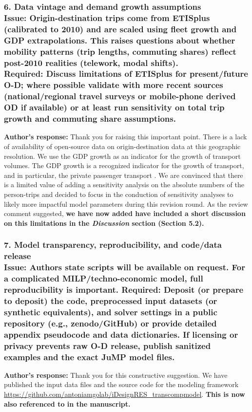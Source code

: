 \documentclass[11pt]{article}
\begin{document}
\color{reviewergrey}

\subsubsection*{6. Data vintage and demand growth assumptions \\ 
\textbf{Issue:} Origin-destination trips come from ETISplus (calibrated to 2010) and are scaled using fleet growth and GDP extrapolations. This raises questions about whether mobility patterns (trip lengths, commuting shares) reflect post-2010 realities (telework, modal shifts). \\
\textbf{Required:} Discuss limitations of ETISplus for present/future O-D; where possible validate with more recent sources (national/regional travel surveys or mobile-phone derived OD if available) or at least run sensitivity on total trip growth and commuting share assumptions.
}
\color{authorblue}
\noindent \textcolor{authorblue}{\textbf{Author's response:}} Thank you for raising this important point. There is a lack of availability of open-source data on origin-destination data at this geographic resolution. We use the GDP growth as an indicator for the growth of transport volumes. The GDP growth is a recognized indicator for the growth of transport, and in particular, the private passenger transport \citep{EDELENBOSCH2017281, thomsen2024projecting}. We are convinced that there is a limited value of adding a sensitivity analysis on the absolute numbers of the person-trips and decided to focus in the conduction of sensitivity analyses to likely more impactful model parameters during this revision round. 
As the review comment suggested, \textbf{we have now added have included a short discussion on this limitations in the \textit{Discussion} section (Section 5.2).}
\color{reviewergrey}
\subsubsection*{7. Model transparency, reproducibility, and code/data release \\
\textbf{Issue:} Authors state scripts will be available on request. For a complicated MILP/techno-economic model, full reproducibility is important.
\textbf{Required:} Deposit (or prepare to deposit) the code, preprocessed input datasets (or synthetic equivalents), and solver settings in a public repository (e.g., zenodo/GitHub) or provide detailed appendix pseudocode and data dictionaries. If licensing or privacy prevents raw O-D release, publish sanitized examples and the exact JuMP model files.}
\color{authorblue}
 \noindent \textcolor{authorblue}{\textbf{Author's response:}}  Thank you for this constructive suggestion. We have published the input data files and the source code for the modeling framework \url{https://github.com/antoniamgolab/iDesignRES_transcompmodel}. \textbf{This is now also referenced to in the manuscript.}
\color{reviewergrey}
\end{document}
